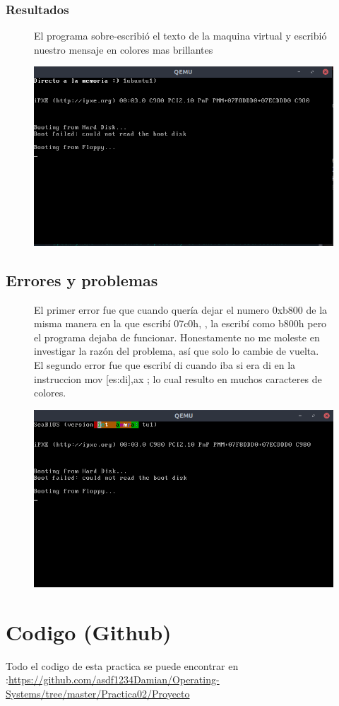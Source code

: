 \documentclass[12pt]{article}
\begin{document}
\subsubsection{Resultados}
\begin{figure}[!htb]
\begin{minipage}{0.5\textwidth}
El programa sobre-escribió el texto de la maquina virtual y escribió nuestro mensaje en colores mas brillantes
\end{minipage}
\begin{minipage}{0.5\textwidth}
\includegraphics{ParteDos.png}
\end{minipage}
\end{figure}
\subsection{Errores y problemas}
\begin{figure}[!htb]
\begin{minipage}{0.5\textwidth}
El primer error fue que cuando quería dejar el numero 0xb800 de la misma manera en la que escribí 07c0h, , la escribí como b800h pero el programa dejaba de funcionar. Honestamente no me moleste en investigar la razón del problema, así que solo lo cambie de vuelta. \\
El segundo error fue que escribí di cuando iba si era di en la instruccion mov [es:di],ax ; lo cual resulto en muchos caracteres de colores. 
\end{minipage}
\begin{minipage}{0.5\textwidth}
\includegraphics{Prompt.png}
\end{minipage}
\end{figure}
\section{Codigo (Github)}
Todo el codigo de esta practica se puede encontrar en :\url{https://github.com/asdf1234Damian/Operating-Systems/tree/master/Practica02/Proyecto}
\nocite{*}


\end{document}
